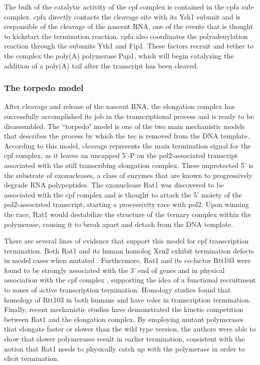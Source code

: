 The bulk of the catalytic activity of the \gls{cpf} complex is contained in the \gls{cpfa} sub-complex.
\gls{cpfa} directly contacts the cleavage site with its Ysh1 subunit and is responsible of the cleavage of the nascent RNA, one of the events that is thought to kickstart the termination reaction.
\gls{cpfa} also coordinates the polyadenylation reaction through the subunits Yth1 and Fip1. 
These factors recruit and tether to the complex the poly(A) polymerase Pap1, which will begin catalyzing the addition of a poly(A) tail after the transcript has been cleaved.

\subsubsection{The torpedo model}

After cleavage and release of the nascent RNA, the elongation complex has successfully accomplished its job in the transcriptional process and is ready to be disassembled.
The ``torpedo" model is one of the two main mechanistic models that describes the process by which the \gls{tec} is removed from the DNA template.
According to this model, cleavage represents the main termination signal for the \gls{cpf} complex, as it leaves an uncapped 5'-P on the \gls{pol2}-associated transcript associated with the still transcribing elongation complex.
These unprotected 5' is the substrate of \FtoT{} exonucleases, a class of enzymes that are known to progressively degrade RNA polypeptides.
The \FtoT{} exonuclease Rat1 was discovered to be associated with the \gls{cpf} complex and is thought to attack the 5' moiety of the \gls{pol2}-associated transcript, starting a processivity race with \gls{pol2}.
Upon winning the race, Rat1 would destabilize the structure of the ternary complex within the polymerase, causing it to break apart and detach from the DNA template.

There are several lines of evidence that support this model for \gls{cpf} transcription termination.
Both Rat1 and its human homolog Xrn2 exhibit termination defects in model cases when mutated \citep{kim:2004:yeast, west:2004:human}.
Furthermore, Rat1 and its co-factor Rtt103 were found to be strongly associated with the 3' end of genes and in physical association with the \gls{cpf} complex \citep{kim:2004:yeast,luo:2006:role}, supporting the idea of a functional recruitment to zones of active transcription termination.
Homology studies found that homologs of Rtt103 in both humans and \cele{} have roles in transcription termination\citep{morales:2014:kub5hera, cui:2008:genes}.
Finally, recent mechanistic studies \invivo{} have demonstrated the kinetic competition between Rat1 and the elongation complex. By employing mutant polymerases that elongate faster or slower than the wild type version, the authors were able to show that slower polymerases result in earlier termination, consistent with the notion that Rat1 needs to physically catch up with the polymerase in order to elicit termination\citep{fong:2015:effects}.

